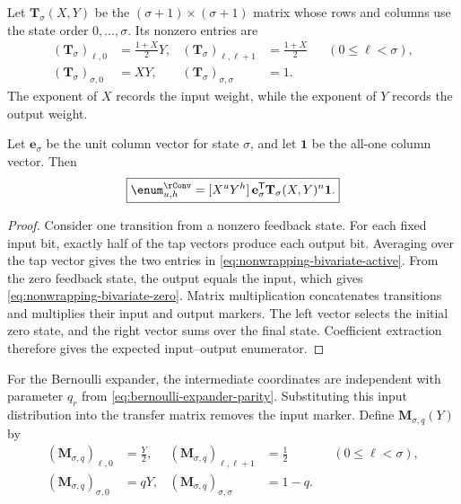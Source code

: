 Let $\mathbf T_\sigma(X,Y)$ be the $(\sigma+1)\times(\sigma+1)$ matrix whose rows and
columns use the state order $0,\ldots,\sigma$.  Its nonzero entries are
\begin{align}
 (\mathbf T_\sigma)_{\ell,0}
   &=\frac{1+X}{2}Y,
 &
 (\mathbf T_\sigma)_{\ell,\ell+1}
   &=\frac{1+X}{2}
 &&(0\leq\ell<\sigma),
 \label{eq:nonwrapping-bivariate-active}\\
 (\mathbf T_\sigma)_{\sigma,0}
   &=XY,
 &
 (\mathbf T_\sigma)_{\sigma,\sigma}
   &=1.
 \label{eq:nonwrapping-bivariate-zero}
\end{align}
The exponent of $X$ records the input weight, while the exponent of $Y$ records
the output weight.

\begin{lemma}
\label{lem:nonwrapping-transfer-enumerator}
Let $\mathbf e_\sigma$ be the unit column vector for state $\sigma$, and let
$\mathbf 1$ be the all-one column vector.  Then
\begin{equation}
 \boxed{
 \enum^{\rConv}_{u,h}
   =
 [X^uY^h]\,\mathbf e_\sigma^\mathsf{T}
 \mathbf T_\sigma(X,Y)^n\mathbf 1.
 }
 \label{eq:nonwrapping-transfer-enumerator}
\end{equation}
\end{lemma}

\begin{proof}
Consider one transition from a nonzero feedback state.  For each fixed input
bit, exactly half of the tap vectors produce each output bit.  Averaging over
the tap vector gives the two entries in
\eqref{eq:nonwrapping-bivariate-active}.  From the zero feedback state, the
output equals the input, which gives
\eqref{eq:nonwrapping-bivariate-zero}.  Matrix multiplication concatenates
transitions and multiplies their input and output markers.  The left vector
selects the initial zero state, and the right vector sums over the final state.
Coefficient extraction therefore gives the expected input--output enumerator.
\end{proof}

For the Bernoulli expander, the intermediate coordinates are independent with
parameter $q_r$ from \eqref{eq:bernoulli-expander-parity}.  Substituting this
input distribution into the transfer matrix removes the input marker.  Define
$\mathbf M_{\sigma,q}(Y)$ by
\begin{align}
 (\mathbf M_{\sigma,q})_{\ell,0}
   &=\frac{Y}{2},
 &
 (\mathbf M_{\sigma,q})_{\ell,\ell+1}
   &=\frac{1}{2}
 &&(0\leq\ell<\sigma),
 \label{eq:nonwrapping-message-active}\\
 (\mathbf M_{\sigma,q})_{\sigma,0}
   &=qY,
 &
 (\mathbf M_{\sigma,q})_{\sigma,\sigma}
   &=1-q.
 \label{eq:nonwrapping-message-zero}
\end{align}

